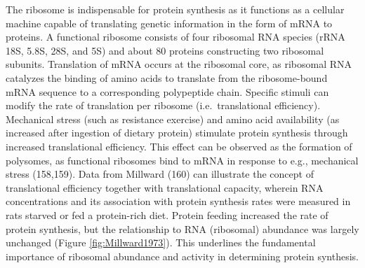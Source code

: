 \documentclass[twoside,10pt]{gihclass} %
\begin{document}
The ribosome is indispensable for protein synthesis as it functions as a cellular machine capable of translating genetic information in the form of mRNA to proteins.
A functional ribosome consists of four ribosomal RNA species (rRNA 18S, 5.8S, 28S, and 5S) and about 80 proteins constructing two ribosomal subunits. Translation of mRNA occurs at the ribosomal core, as ribosomal RNA catalyzes the binding of amino acids to translate from the ribosome-bound mRNA sequence to a corresponding polypeptide chain.
Specific stimuli can modify the rate of translation per ribosome (i.e.~translational efficiency).
Mechanical stress (such as resistance exercise) and amino acid availability (as increased after ingestion of dietary protein) stimulate protein synthesis through increased translational efficiency.
This effect can be observed as the formation of polysomes, as functional ribosomes bind to mRNA in response to e.g., mechanical stress
(158,159).
Data from Millward (160) can illustrate the concept of translational efficiency together with translational capacity,
wherein RNA concentrations and its association with protein synthesis rates were measured in rats starved or fed a protein-rich diet.
Protein feeding increased the rate of protein synthesis, but the relationship to RNA (ribosomal) abundance was largely unchanged (Figure \ref{fig:Millward1973}). This underlines the fundamental importance of ribosomal abundance and activity in determining protein synthesis.
\end{document}
